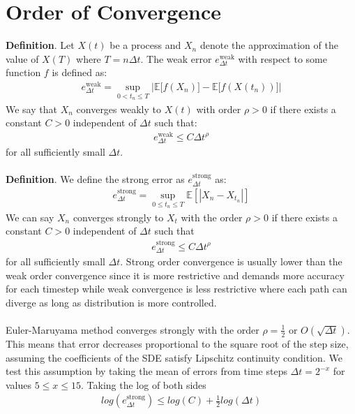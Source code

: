 \section*{Order of Convergence}
\textbf{Definition}. Let $X(t)$ be a process and $X_n$ denote the approximation of the value of $X(T)$ where $T = n\Delta t$. The weak error $e_{\Delta t}^{\text{weak}}$ with respect to some function $f$ is defined as:
\begin{align*}
e_{\Delta t}^{\text{weak}} = \sup_{0 \lt t_n \le T} \bigg|\mathbb{E}\big[f(X_n)\big] - \mathbb{E}\big[f(X(t_n))\big] \bigg|
\end{align*}
We say that $X_n$ converges weakly to $X(t)$ with order $\rho > 0$ if there exists a constant $C > 0$ independent of  $\Delta t$ such that:
\begin{align*}
e_{\Delta t}^{\text{weak}} \le C \Delta t^{\rho}
\end{align*}
for all sufficiently small $\Delta t$.
\\
\\
\textbf{Definition}. We define the strong error as $e_{\Delta t}^{\text{strong}}$ as:
\begin{align*}
e_{\Delta t}^{\text{strong}} = \sup_{0 \le t_n \le T} \mathbb{E}\left[\left|X_n - X_{t_n}\right|\right]
\end{align*}
We can say $X_n$ converges strongly to $X_t$ with the order $\rho > 0$ if there exists a constant $C > 0$ independent of $\Delta t$ such that
\begin{align*}
e_{\Delta t}^{\text{strong}} \le C \Delta t^{\rho}
\end{align*}
for all sufficiently small $\Delta t$.
Strong order convergence is usually lower than the weak order convergence since it is more restrictive and demands more accuracy for each timestep while weak convergence is less restrictive where each path can diverge as long as distribution is more controlled.
\\
\\
Euler-Maruyama method converges strongly with the order $\rho=\frac{1}{2}$ or $O(\sqrt{\Delta t})$. This means that error decreases proportional to the square root of the step size, assuming the coefficients of the SDE satisfy Lipschitz\cite{wiki:lipschitz_continuity} continuity condition.
We test this assumption by taking the mean of errors from time steps $\Delta t=2^{-x}$ for values $5 \le x \le 15$\cite{code}. Taking the log of both sides
\begin{align*}
log\left(e_{\Delta t}^{\text{strong}}\right) \le log(C) + \frac{1}{2} log(\Delta t)
\end{align*}
